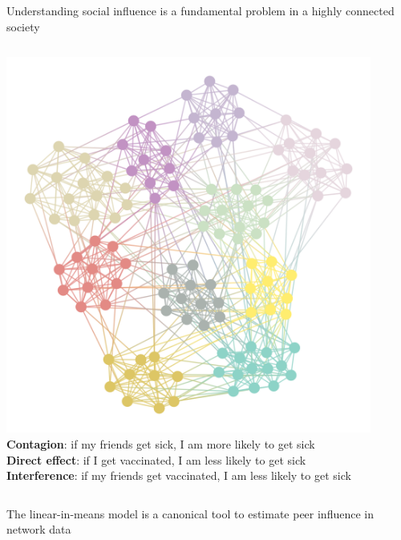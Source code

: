 \documentclass[final]{beamer}
\newlength{\colwidth}
\begin{document}
\begin{frame}[t]
\begin{columns}[t]
\begin{column}{\colwidth}
\begin{block}{Understanding social influence is a fundamental problem in a highly connected society}
                \begin{columns}
                    \centering
                    \includegraphics[width=0.9\textwidth]{./figures/assortative.png}
                    \textbf{Contagion}: if my friends get sick, I am more likely to get sick \\
                    \vspace{8mm}
                    \textbf{Direct effect}: if I get vaccinated, I am less likely to get sick \\
                    \vspace{8mm}
                    \textbf{Interference}: if my friends get vaccinated, I am less likely to get sick \\
                \end{columns}

            \end{block}

            \begin{block}{The linear-in-means model is a canonical tool to estimate peer influence in network data}



\end{block}
\end{column}
\end{columns}
\end{frame}
\end{document}
